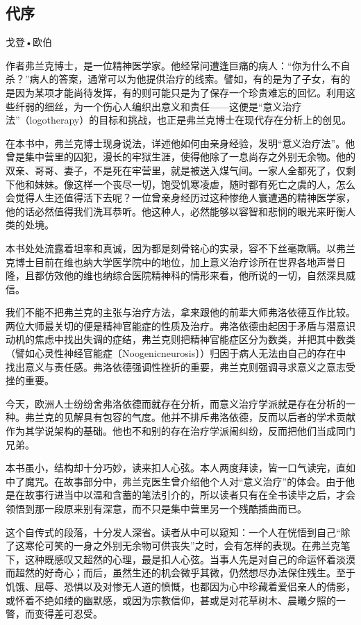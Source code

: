 \documentclass[11pt,oneside]{book}
\begin{document}
\begin{common-format}
\mainmatter 

\chapter*{代序}
{\large 戈登•欧伯}

作者弗兰克博士，是一位精神医学家。他经常问遭逢巨痛的病人：“你为什么不自杀？”病人的答案，通常可以为他提供治疗的线索。譬如，有的是为了子女，有的是因为某项才能尚待发挥，有的则可能只是为了保存一个珍贵难忘的回忆。利用这些纤弱的细丝，为一个伤心人编织出意义和责任——这便是“意义治疗法”（logotherapy）的目标和挑战，也正是弗兰克博士在现代存在分析上的创见。

在本书中，弗兰克博士现身说法，详述他如何由亲身经验，发明“意义治疗法”。他曾是集中营里的囚犯，漫长的牢狱生涯，使得他除了一息尚存之外别无余物。他的双亲、哥哥、妻子，不是死在牢营里，就是被送入煤气间。一家人全都死了，仅剩下他和妹妹。像这样一个丧尽一切，饱受饥寒凌虐，随时都有死亡之虞的人，怎么会觉得人生还值得活下去呢？一位曾亲身经历过这种惨绝人寰遭遇的精神医学家，他的话必然值得我们洗耳恭听。他这种人，必然能够以容智和悲悯的眼光来盱衡人类的处境。

本书处处流露着坦率和真诚，因为都是刻骨铭心的实录，容不下丝毫欺瞒。以弗兰克博士目前在维也纳大学医学院中的地位，加上意义治疗诊所在世界各地声誉日隆，且都仿效他的维也纳综合医院精神科的情形来看，他所说的一切，自然深具威信。

我们不能不把弗兰克的主张与治疗方法，拿来跟他的前辈大师弗洛依德互作比较。两位大师最关切的便是精神官能症的性质及治疗。弗洛依德由起因于矛盾与潜意识动机的焦虑中找出失调的症结，弗兰克则把精神官能症区分为数类，并把其中数类（譬如心灵性神经官能症〔Noogenicneurosis〕）归因于病人无法由自己的存在中找出意义与责任感。弗洛依德强调性挫折的重要，弗兰克则强调寻求意义之意志受挫的重要。

今天，欧洲人士纷纷舍弗洛依德而就存在分析，而意义治疗学派就是存在分析的一种。弗兰克的见解具有包容的气度。他并不排斥弗洛依德，反而以后者的学术贡献作为其学说架构的基础。他也不和别的存在治疗学派闹纠纷，反而把他们当成同门兄弟。

本书虽小，结构却十分巧妙，读来扣人心弦。本人两度拜读，皆一口气读完，直如中了魔咒。在故事部分中，弗兰克医生曾介绍他个人对“意义治疗”的体会。由于他是在故事行进当中以温和含蓄的笔法引介的，所以读者只有在全书读毕之后，才会领悟到那一段原来别有深意，而不只是集中营里另一个残酷插曲而已。

这个自传式的段落，十分发人深省。读者从中可以窥知：一个人在恍悟到自己“除了这寒伦可笑的一身之外别无余物可供丧失”之时，会有怎样的表现。在弗兰克笔下，这种既感叹又超然的心理，最是扣人心弦。当事人先是对自己的命运怀着淡漠而超然的好奇心；而后，虽然生还的机会微乎其微，仍然想尽办法保住残生。至于饥饿、屈辱、恐惧以及对惨无人道的愤慨，也都因为心中珍藏着爱侣亲人的倩影，或怀着不绝如缕的幽默感，或因为宗教信仰，甚或是对花草树木、晨曦夕照的一瞥，而变得差可忍受。


\end{common-format}
\end{document}
